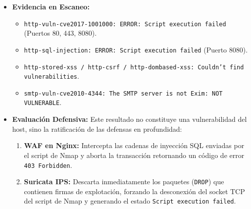 \begin{itemize}
  \item \textbf{Evidencia en Escaneo:}
    \begin{itemize}
      \item \texttt{http-vuln-cve2017-1001000: ERROR: Script execution failed} (Puertos 80, 443, 8080).
      \item \texttt{http-sql-injection: ERROR: Script execution failed} (Puerto 8080).
      \item \texttt{http-stored-xss / http-csrf / http-dombased-xss: Couldn't find vulnerabilities}.
      \item \texttt{smtp-vuln-cve2010-4344: The SMTP server is not Exim: NOT VULNERABLE}.
    \end{itemize}
  \item \textbf{Evaluación Defensiva:} Este resultado no constituye una vulnerabilidad del host, sino la ratificación de las defensas en profundidad:
    \begin{enumerate}
      \item \textbf{WAF en Nginx:} Intercepta las cadenas de inyección SQL enviadas por el script de Nmap y aborta la transacción retornando un código de error \texttt{403 Forbidden}.
      \item \textbf{Suricata IPS:} Descarta inmediatamente los paquetes (\texttt{DROP}) que contienen firmas de explotación, forzando la desconexión del socket TCP del script de Nmap y generando el estado \texttt{Script execution failed}.
    \end{enumerate}
\end{itemize}
